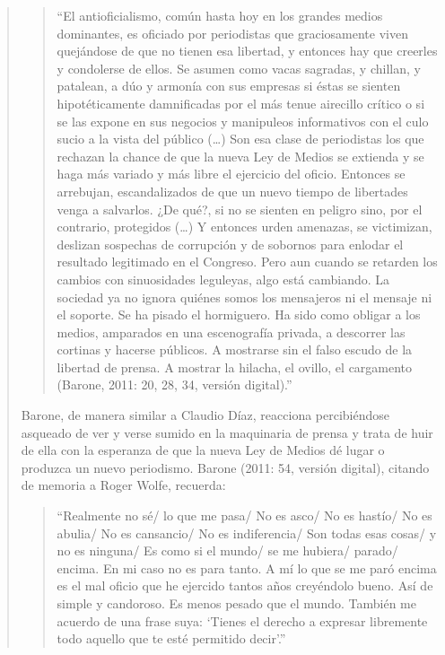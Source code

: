 \begin{quote}
\begin{quote}
	\enquote{El antioficialismo, común hasta hoy en los grandes medios dominantes, es oficiado por periodistas que graciosamente viven quejándose de que no tienen esa libertad, y entonces hay que creerles y condolerse de ellos. Se asumen como vacas sagradas, y chillan, y patalean, a dúo y armonía con sus empresas si éstas se sienten hipotéticamente damnificadas por el más tenue airecillo crítico o si se las expone en sus negocios y manipuleos informativos con el culo sucio a la vista del público (\dots) Son esa clase de periodistas los que rechazan la chance de que la nueva Ley de Medios se extienda y se haga más variado y más libre el ejercicio del oficio. Entonces se arrebujan, escandalizados de que un nuevo tiempo de libertades venga a salvarlos. ¿De qué?, si no se sienten en peligro sino, por el contrario, protegidos (\dots) Y entonces urden amenazas, se victimizan, deslizan sospechas de corrupción y de sobornos para enlodar el resultado legitimado en el Congreso. Pero aun cuando se retarden los cambios con sinuosidades leguleyas, algo está cambiando. La sociedad ya no ignora quiénes somos los mensajeros ni el mensaje ni el soporte. Se ha pisado el hormiguero. Ha sido como obligar a los medios, amparados en una escenografía privada, a descorrer las cortinas y hacerse públicos. A mostrarse sin el falso escudo de la libertad de prensa. A mostrar la hilacha, el ovillo, el cargamento (Barone, 2011: 20, 28, 34, versión digital).}
\end{quote}


Barone, de manera similar a Claudio Díaz, reacciona percibiéndose asqueado de ver y verse sumido en la maquinaria de prensa y trata de huir de ella con la esperanza de que la nueva Ley de Medios dé lugar o produzca un nuevo periodismo. Barone (2011: 54, versión digital), citando de memoria a Roger Wolfe, recuerda:

\begin{quote}
	\enquote{Realmente no sé/ lo que me pasa/ No es asco/ No es hastío/ No es abulia/ No es cansancio/ No es indiferencia/ Son todas esas cosas/ y no es ninguna/ Es como si el mundo/ se me hubiera/ parado/ encima. En mi caso no es para tanto. A mí lo que se me paró encima es el mal oficio que he ejercido tantos años creyéndolo bueno. Así de simple y candoroso. Es menos pesado que el mundo. También me acuerdo de una frase suya: \enquote{Tienes el derecho a expresar libremente todo aquello que te esté permitido decir}.}
\end{quote}



\end{quote}
